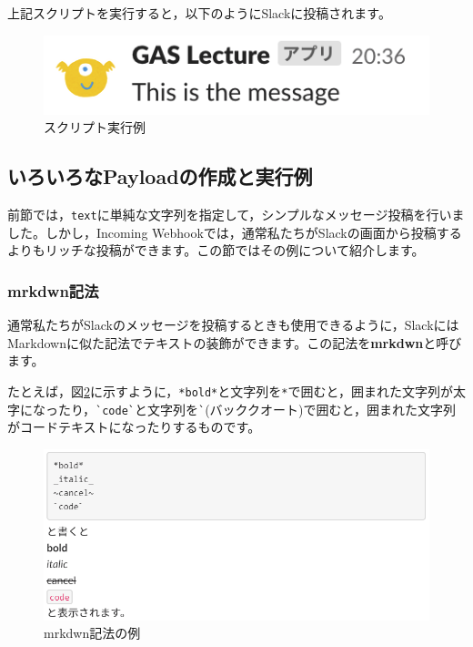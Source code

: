 \documentclass[uplatex,a4j]{jsarticle}
\begin{document}
上記スクリプトを実行すると，以下のようにSlackに投稿されます。

\begin{figure}[H]
 \centering
 \includegraphics[keepaspectratio, scale=1.0]{images/standalone_gas3.png}
 \caption{スクリプト実行例}
 \label{fig:standalone_gas3}
\end{figure}


\subsection{いろいろなPayloadの作成と実行例}


前節では，\verb|text|に単純な文字列を指定して，シンプルなメッセージ投稿を行いました。しかし，Incoming Webhookでは，通常私たちがSlackの画面から投稿するよりもリッチな投稿ができます。この節ではその例について紹介します。

\subsubsection{mrkdwn記法}


通常私たちがSlackのメッセージを投稿するときも使用できるように，SlackにはMarkdownに似た記法でテキストの装飾ができます。この記法を\textbf{mrkdwn}と呼びます。


たとえば，図\ref{fig:mrkdwn_sample}に示すように，\verb|*bold*|と文字列を\verb|*|で囲むと，囲まれた文字列が太字になったり，\verb|`code`|と文字列を\verb|`|(バッククオート)で囲むと，囲まれた文字列がコードテキストになったりするものです。

\begin{figure}[H]
 \centering
 \includegraphics[keepaspectratio, scale=0.8]{images/mrkdwn_sample.png}
 \caption{mrkdwn記法の例}
 \label{fig:mrkdwn_sample}
\end{figure}
\end{document}
